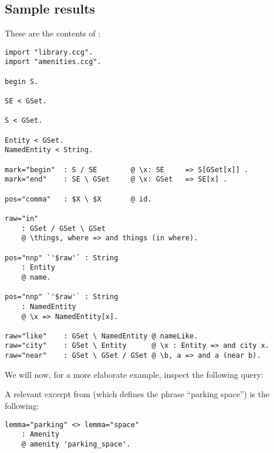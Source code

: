 \documentclass[main.tex]{subfiles}
\begin{document}
\subsection{Sample results}
These are the contents of :
\begin{lstwrap}\begin{lstlisting}
import "library.ccg".
import "amenities.ccg".

begin S.

SE < GSet.

S < GSet.

Entity < GSet.
NamedEntity < String.

mark="begin"  : S / SE        @ \x: SE     => S[GSet[x]] .
mark="end"    : SE \ GSet     @ \x: GSet   => SE[x] .

pos="comma"   : $X \ $X       @ id.

raw="in"      
    : GSet / GSet \ GSet 
    @ \things, where => and things (in where).

pos="nnp" `'$raw'` : String
    : Entity          
    @ name.

pos="nnp" `'$raw'` : String
    : NamedEntity       
    @ \x => NamedEntity[x].

raw="like"    : GSet \ NamedEntity @ nameLike.
raw="city"    : GSet \ Entity      @ \x : Entity => and city x.
raw="near"    : GSet \ GSet / GSet @ \b, a => and a (near b).
\end{lstlisting}\end{lstwrap}

We will now, for a more elaborate example, inspect the following query:
\begin{center}
\end{center}

A relevant excerpt from  (which defines the phrase
``parking space'') is the following:
\begin{lstwrap}\begin{lstlisting}
lemma="parking" <> lemma="space"
    : Amenity
    @ amenity 'parking_space'.
\end{lstlisting}\end{lstwrap}
\end{document}
